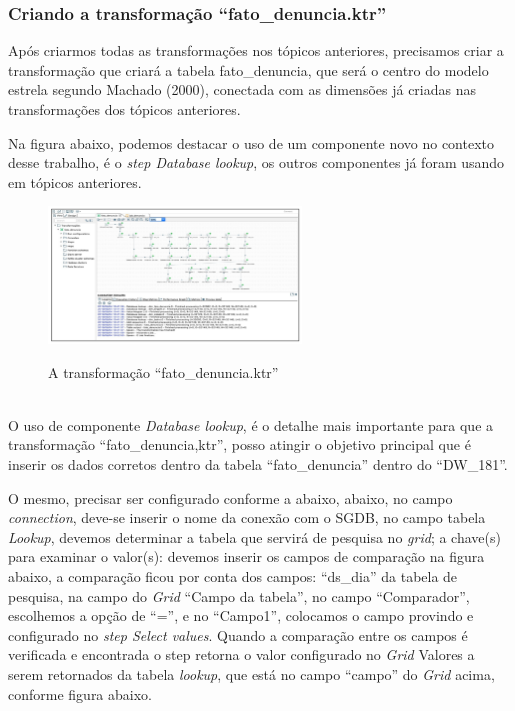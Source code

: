 \subsubsection{Criando a transforma\c{c}\~{a}o ``fato\_denuncia.ktr''}

Ap\'os criarmos todas as transforma\c{c}\~{o}es nos t\'opicos anteriores,
 precisamos criar a transforma\c{c}\~{a}o que criar\'{a} a tabela fato\_denuncia, 
 que ser\'{a} o centro do modelo estrela segundo Machado (2000), conectada com as dimens\~{o}es j\'{a} 
 criadas nas transforma\c{c}\~{o}es dos t\'opicos anteriores.

Na figura abaixo, podemos destacar o uso de um componente novo no contexto desse trabalho, \'{e} o 
\textit{step Database lookup}, os outros componentes j\'{a} foram usando em t\'opicos anteriores.

\begin{figure}[H]
	\vspace*{0,2cm}
    \centering
    \caption{A transforma\c{c}\~{a}o ``fato\_denuncia.ktr''}
    \includegraphics[width=0.6\textwidth]{./04-figuras/figura-fato}
    \label{fig:ilustfigfato}
\end{figure}
\vspace*{-0,9cm}
{\raggedright {}} \\

O uso de componente \textit{Database lookup}, \'{e} o detalhe mais importante para que a transforma\c{c}\~{a}o 
``fato\_denuncia,ktr'', posso atingir o objetivo principal que \'{e} inserir os dados corretos dentro da tabela 
``fato\_denuncia'' dentro do ``DW\_181''. 

O mesmo, precisar ser configurado conforme a abaixo, abaixo, no campo \textit{connection}, deve-se inserir o 
nome da conex\~{a}o com o SGDB, no campo tabela \textit{Lookup}, devemos determinar a tabela que servir\'{a} de 
pesquisa no \textit{grid}; a chave(s) para examinar o valor(s): devemos inserir os campos de compara\c{c}\~{a}o na 
figura abaixo, a compara\c{c}\~{a}o ficou por conta dos campos: ``ds\_dia''  da tabela de pesquisa, na campo do 
\textit{Grid} ``Campo da tabela'', no campo ``Comparador'', escolhemos a op\c{c}\~{a}o de ``='', e no 
``Campo1'', colocamos o campo provindo e configurado no \textit{step Select values}. Quando a compara\c{c}\~{a}o 
entre os campos \'{e} verificada e encontrada o step retorna o valor configurado no \textit{Grid} Valores a serem 
retornados da tabela \textit{lookup}, que est\'{a} no campo ``campo'' do \textit{Grid} acima, conforme figura abaixo.

